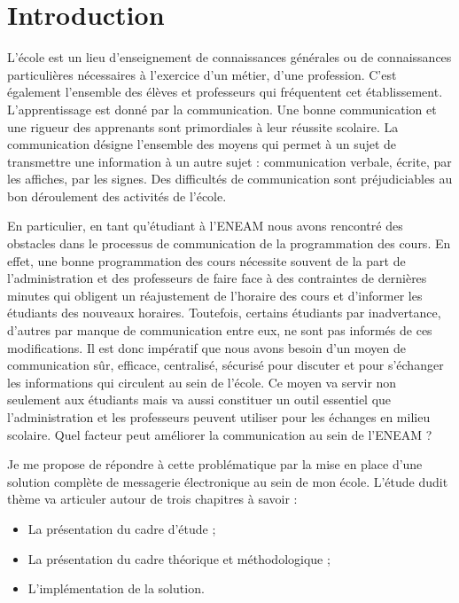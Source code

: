 \documentclass[a4paper,12pt,french]{report} %
\begin{document}
\onehalfspacing %
\clearpage
\nocesure
\chapter*{Introduction}
L’école est un lieu d’enseignement de connaissances générales ou de connaissances particulières nécessaires à l’exercice d’un métier, d’une profession. C’est également l’ensemble des élèves et professeurs qui fréquentent cet établissement. L’apprentissage est donné par la communication. Une bonne communication et une rigueur des apprenants sont primordiales à leur réussite scolaire. La communication désigne l’ensemble des moyens qui permet à un sujet de transmettre une information à un autre sujet : communication verbale, écrite, par les affiches, par les signes. Des difficultés de communication sont préjudiciables au bon déroulement des activités de l’école.

En particulier, en tant qu’étudiant à l’ENEAM nous avons rencontré des obstacles dans le processus de communication de la programmation des cours. En effet, une bonne programmation des cours nécessite souvent de la part de l’administration et des professeurs de faire face à des contraintes de dernières minutes qui obligent un réajustement de l’horaire des cours  et d’informer les étudiants des nouveaux horaires. Toutefois, certains étudiants par inadvertance, d’autres par manque de communication entre eux, ne sont pas informés de ces modifications. Il est donc impératif que nous avons besoin d’un moyen de communication sûr, efficace, centralisé, sécurisé pour discuter et pour s’échanger les informations qui circulent au sein de l’école. Ce moyen va servir non seulement aux étudiants mais va aussi constituer un outil essentiel que l’administration et les professeurs peuvent utiliser pour les échanges en milieu
scolaire. Quel facteur peut améliorer la communication au sein de l’ENEAM ?

Je me propose de répondre à cette problématique par la mise en place d’une solution complète de messagerie électronique au sein de mon école.
L'étude dudit thème va articuler autour de trois chapitres à savoir :
\begin{itemize}
	\item La présentation du cadre d'étude ;
	\item La présentation du cadre théorique et méthodologique ;
	\item L'implémentation de la solution.
\end{itemize}
\end{document}
